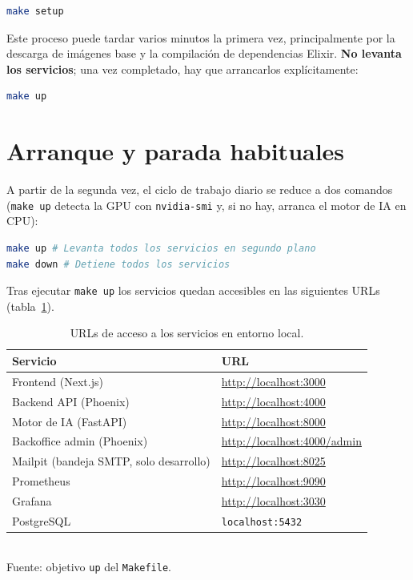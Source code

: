 \begin{lstlisting}[language=bash]
make setup
\end{lstlisting}

Este proceso puede tardar varios minutos la primera vez, principalmente por la descarga de imágenes base y la compilación de dependencias Elixir. \textbf{No levanta los servicios}; una vez completado, hay que arrancarlos explícitamente:

\begin{lstlisting}[language=bash]
make up
\end{lstlisting}

\section{Arranque y parada habituales}

A partir de la segunda vez, el ciclo de trabajo diario se reduce a dos comandos (\texttt{make up} detecta la GPU con \texttt{nvidia-smi} y, si no hay, arranca el motor de IA en CPU):

\begin{lstlisting}[language=bash]
make up # Levanta todos los servicios en segundo plano
make down # Detiene todos los servicios
\end{lstlisting}

Tras ejecutar \texttt{make up} los servicios quedan accesibles en las siguientes URLs (tabla~\ref{tab:urls}).

\begin{table}[h]
\centering
\caption{URLs de acceso a los servicios en entorno local.}
\label{tab:urls}
\begin{tabular}{ll}
\hline
\textbf{Servicio} & \textbf{URL} \\
\hline
Frontend (Next.js) & \url{http://localhost:3000} \\
Backend API (Phoenix) & \url{http://localhost:4000} \\
Motor de IA (FastAPI) & \url{http://localhost:8000} \\
Backoffice admin (Phoenix) & \url{http://localhost:4000/admin} \\
Mailpit (bandeja SMTP, solo desarrollo) & \url{http://localhost:8025} \\
Prometheus & \url{http://localhost:9090} \\
Grafana & \url{http://localhost:3030} \\
PostgreSQL & \texttt{localhost:5432} \\
\hline
\end{tabular}
\\[4pt]
{\footnotesize Fuente: objetivo \texttt{up} del \texttt{Makefile}.}
\end{table}

